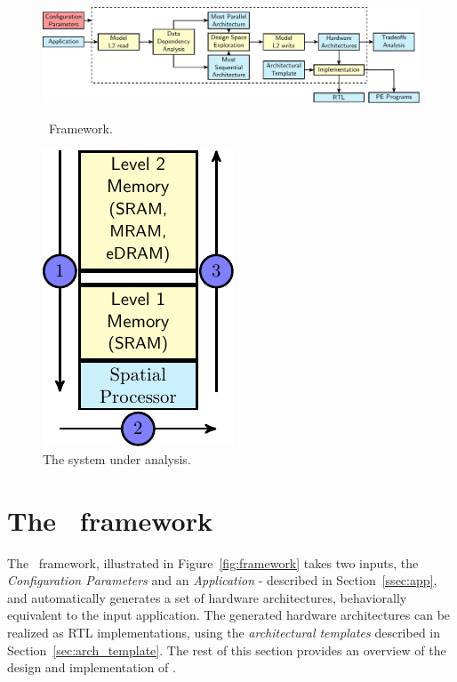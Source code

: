 \begin{figure}[!ht]
\begin{minipage}{.7\textwidth}
\includegraphics[width=\textwidth,left]{images/framework_v2.pdf}
  \caption{\small \frameworkname~Framework.}{}
  \label{fig:framework}
\end{minipage}%
\begin{minipage}{.3\textwidth}
    \centering
\includegraphics[width=.4\textwidth]{images/architecture_v2.pdf}
\caption{\small The system under analysis.
    }
\label{fig:system}
\end{minipage}
\squeezeup
\squeezeup
\end{figure}
\vspace{-1mm}
\section{The \frameworkname~framework}
\label{sec:framework}
The \frameworkname~framework, illustrated in Figure~\ref{fig:framework} takes two inputs, the \textit{Configuration Parameters} and an \textit{Application} - described in Section~\ref{ssec:app}, and automatically generates a set of hardware architectures, behaviorally equivalent to the input application.
The generated hardware architectures can be realized as RTL implementations, using the \textit{architectural templates} described in Section~\ref{sec:arch_template}.
The rest of this section provides an overview of the design and implementation of \frameworkname.

